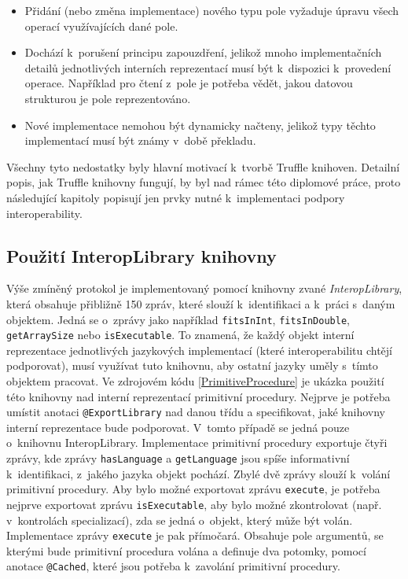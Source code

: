 \documentclass[
  master,
  biblatex,
  figures=true,
  theorems,
  sourcecodes,
  glossaries,
  index
]{kidiplom}
\begin{document}
\begin{itemize}
    \item Přidání (nebo změna implementace) nového typu pole vyžaduje úpravu všech operací využívajících dané pole.
    \item Dochází k~porušení principu zapouzdření, jelikož mnoho implementačních detailů jednotlivých interních reprezentací musí být k~dispozici k~provedení operace. Například pro čtení z~pole je potřeba vědět, jakou datovou strukturou je pole reprezentováno. 
    \item Nové implementace nemohou být dynamicky načteny, jelikož typy těchto implementací musí být známy v~době překladu.
\end{itemize}

Všechny tyto nedostatky byly hlavní motivací k~tvorbě Truffle knihoven. Detailní popis, jak Truffle knihovny fungují, by byl nad rámec této diplomové práce, proto následující kapitoly popisují jen prvky nutné k~implementaci podpory interoperability.


\subsection{Použití InteropLibrary knihovny}
Výše zmíněný protokol je implementovaný pomocí knihovny zvané \textit{InteropLibrary}, která obsahuje přibližně 150 zpráv, které slouží k~identifikaci a k~práci s~daným objektem. Jedná se o~zprávy jako například \texttt{fitsInInt}, \texttt{fitsInDouble}, \texttt{getArraySize} nebo \texttt{isExecutable}. To znamená, že každý objekt interní reprezentace jednotlivých jazykových implementací (které interoperabilitu chtějí podporovat), musí využívat tuto knihovnu, aby ostatní jazyky uměly s~tímto objektem pracovat. Ve zdrojovém kódu \ref{PrimitiveProcedure} je ukázka použití této knihovny nad interní reprezentací primitivní procedury. Nejprve je potřeba umístit anotaci \texttt{@ExportLibrary} nad danou třídu a specifikovat, jaké knihovny interní reprezentace bude podporovat. V~tomto případě se jedná pouze o~knihovnu InteropLibrary. Implementace primitivní procedury exportuje čtyři zprávy, kde zprávy \texttt{hasLanguage} a \texttt{getLanguage} jsou spíše informativní k~identifikaci, z~jakého jazyka objekt pochází. Zbylé dvě zprávy slouží k~volání primitivní procedury. Aby bylo možné exportovat zprávu \texttt{execute}, je potřeba nejprve exportovat zprávu \texttt{isExecutable}, aby bylo možné zkontrolovat (např. v~kontrolách specializací), zda se jedná o~objekt, který může být volán. Implementace zprávy \texttt{execute} je pak přímočará. Obsahuje pole argumentů, se kterými bude primitivní procedura volána a definuje dva potomky, pomocí anotace \texttt{@Cached}, které jsou potřeba k~zavolání primitivní procedury. 
\end{document}
